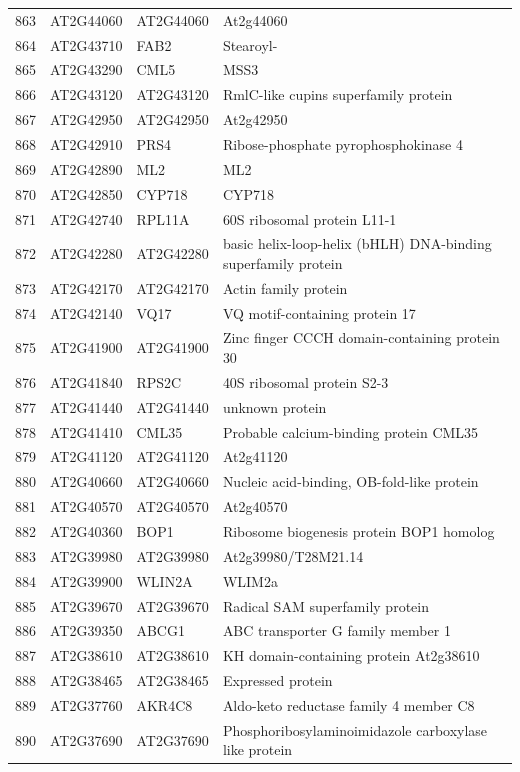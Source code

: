\documentclass[11pt]{article}
\begin{document}
\begin{center}
\begin{tabular}{rlll}
863 & AT2G44060 & AT2G44060 & At2g44060\\
864 & AT2G43710 & FAB2 & Stearoyl-\\
865 & AT2G43290 & CML5 & MSS3\\
866 & AT2G43120 & AT2G43120 & RmlC-like cupins superfamily protein\\
867 & AT2G42950 & AT2G42950 & At2g42950\\
868 & AT2G42910 & PRS4 & Ribose-phosphate pyrophosphokinase 4\\
869 & AT2G42890 & ML2 & ML2\\
870 & AT2G42850 & CYP718 & CYP718\\
871 & AT2G42740 & RPL11A & 60S ribosomal protein L11-1\\
872 & AT2G42280 & AT2G42280 & basic helix-loop-helix (bHLH) DNA-binding superfamily protein\\
873 & AT2G42170 & AT2G42170 & Actin family protein\\
874 & AT2G42140 & VQ17 & VQ motif-containing protein 17\\
875 & AT2G41900 & AT2G41900 & Zinc finger CCCH domain-containing protein 30\\
876 & AT2G41840 & RPS2C & 40S ribosomal protein S2-3\\
877 & AT2G41440 & AT2G41440 & unknown protein\\
878 & AT2G41410 & CML35 & Probable calcium-binding protein CML35\\
879 & AT2G41120 & AT2G41120 & At2g41120\\
880 & AT2G40660 & AT2G40660 & Nucleic acid-binding, OB-fold-like protein\\
881 & AT2G40570 & AT2G40570 & At2g40570\\
882 & AT2G40360 & BOP1 & Ribosome biogenesis protein BOP1 homolog\\
883 & AT2G39980 & AT2G39980 & At2g39980/T28M21.14\\
884 & AT2G39900 & WLIN2A & WLIM2a\\
885 & AT2G39670 & AT2G39670 & Radical SAM superfamily protein\\
886 & AT2G39350 & ABCG1 & ABC transporter G family member 1\\
887 & AT2G38610 & AT2G38610 & KH domain-containing protein At2g38610\\
888 & AT2G38465 & AT2G38465 & Expressed protein\\
889 & AT2G37760 & AKR4C8 & Aldo-keto reductase family 4 member C8\\
890 & AT2G37690 & AT2G37690 & Phosphoribosylaminoimidazole carboxylase like protein\\

\end{tabular}
\end{center}
\end{document}

